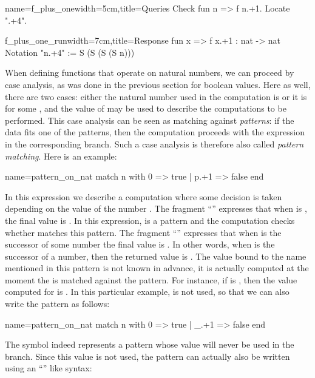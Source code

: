 \begin{coq}{name=f_plus_one}{width=5cm,title=Queries}
Check fun n => f n.+1.
Locate ".+4".
\end{coq}
\begin{coqout}{f_plus_one_run}{width=7cm,title=Response}
fun x => f x.+1 : nat -> nat
Notation "n.+4" := S (S (S (S n)))
\end{coqout}

When defining functions that operate on natural numbers, we can
proceed by case analysis, as was done in the previous section for boolean
values. Here as well, there are two cases: either the natural number used in
the computation is  or it is  for
some , and the value of  may be used to describe the
computations to be performed. This case analysis can be seen as
matching against \emph{patterns}: if the data fits one of
the patterns, then the computation proceeds with the expression in the
corresponding branch.  Such a case analysis is therefore also called
\emph{pattern matching}. Here is an example:

\begin{coq}{name=pattern_on_nat}{}
match n with 0 => true | p.+1 => false end
\end{coq}
In this expression we describe a computation where some decision is
taken depending on the value of the number .  The fragment
``'' expresses that when  is , the final value is
.  In this expression,  is a pattern and the computation
checks whether  matches this pattern.  The fragment
``''  expresses that when  is the successor of
some number  the final value is .  In other words, when
 is the successor of a number, then the returned value is
.  The value bound to the name  mentioned in this pattern is not
known in advance, it is actually computed at the moment the  is matched
against the pattern.  For instance, if  is , then the value computed
for  is .  In this particular example,  is not used, so that we
can also write the pattern as follows:

\begin{coq}{name=pattern_on_nat}{}
match n with 0 => true | _.+1 => false end
\end{coq}
The symbol \C{_} indeed represents a pattern whose value will never be
used in the branch. Since this value is not used, the pattern can
actually also be written using an ``'' like
syntax:

